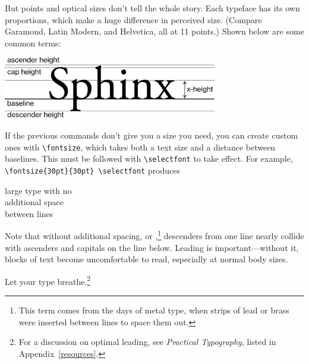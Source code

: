 But points and optical sizes don't tell the whole story.
Each typeface has its own proportions, which make a huge difference
in perceived size.
(Compare Garamond, { Latin Modern},
and {Helvetica}, all at 11 points.)
Shown below are some common terms:
\begin{centerfigure}
\includegraphics[keepaspectratio,width=0.7\textwidth]{heights.png}

\end{centerfigure}

If the previous commands don't give you a size you need,
you can create custom ones with \verb|\fontsize|,
which takes both a text size and a
distance between baselines.
This must be followed with \verb|\selectfont| to take effect.
For example, \texttt{\textbackslash fontsize\{30pt\}\allowbreak\{30pt\}%
\allowbreak\textbackslash selectfont}
produces
\begin{leftfigure}
\lm
\fontsize{30pt}{30pt}\selectfont
large type with no \\
additional space \\
between lines
\end{leftfigure}
{\fontsize{11pt}{11pt}\selectfont
Note that without additional spacing,
or ,\punckern\footnote{This term comes from the days of
metal type, when strips of lead or brass were inserted
between lines to space them out.}
descenders from one line nearly collide with ascenders and capitals on
the line below.
Leading is important---without it, blocks of text become uncomfortable to
read, especially at normal body sizes.\par}
Let your type breathe.\punckern\footnote{For a discussion on optimal leading,
see \textit{Practical Typography}, listed in Appendix~\ref{resources}.}

